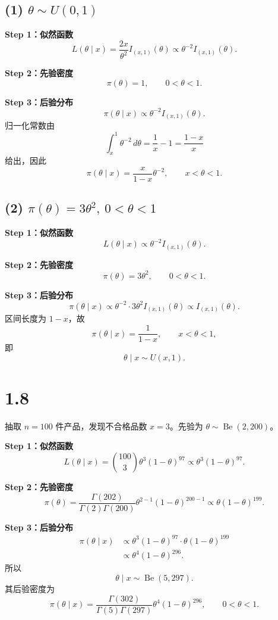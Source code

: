 \documentclass[UTF8,zihao=-4]{ctexart}
\begin{document}
\subsection*{(1) \(\theta\sim U(0,1)\)}
\textbf{Step 1：似然函数}
\[
L(\theta\mid x)=\frac{2x}{\theta^2}I_{(x,1)}(\theta)
\propto\theta^{-2}I_{(x,1)}(\theta).
\]

\textbf{Step 2：先验密度}
\[
\pi(\theta)=1,\qquad0<\theta<1.
\]

\textbf{Step 3：后验分布}
\[
\pi(\theta\mid x)\propto\theta^{-2}I_{(x,1)}(\theta).
\]
归一化常数由
\[
\int_x^1\theta^{-2}\,d\theta=\frac1x-1=\frac{1-x}{x}
\]
给出，因此
\[
\boxed{\pi(\theta\mid x)=\frac{x}{1-x}\theta^{-2},\qquad x<\theta<1.}
\]

\subsection*{(2) \(\pi(\theta)=3\theta^2,\ 0<\theta<1\)}
\textbf{Step 1：似然函数}
\[
L(\theta\mid x)\propto\theta^{-2}I_{(x,1)}(\theta).
\]

\textbf{Step 2：先验密度}
\[
\pi(\theta)=3\theta^2,\qquad0<\theta<1.
\]

\textbf{Step 3：后验分布}
\[
\pi(\theta\mid x)\propto\theta^{-2}\cdot3\theta^2I_{(x,1)}(\theta)
\propto I_{(x,1)}(\theta).
\]
区间长度为 \(1-x\)，故
\[
\boxed{\pi(\theta\mid x)=\frac1{1-x},\qquad x<\theta<1,}
\]
即
\[
\boxed{\theta\mid x\sim U(x,1).}
\]

\section*{1.8}
抽取 \(n=100\) 件产品，发现不合格品数 \(x=3\)。先验为 \(\theta\sim\operatorname{Be}(2,200)\)。

\textbf{Step 1：似然函数}
\[
L(\theta\mid x)=\binom{100}{3}\theta^3(1-\theta)^{97}
\propto\theta^3(1-\theta)^{97}.
\]

\textbf{Step 2：先验密度}
\[
\pi(\theta)=\frac{\Gamma(202)}{\Gamma(2)\Gamma(200)}
\theta^{2-1}(1-\theta)^{200-1}
\propto\theta(1-\theta)^{199}.
\]

\textbf{Step 3：后验分布}
\[
\begin{aligned}
\pi(\theta\mid x)&\propto\theta^3(1-\theta)^{97}
\cdot\theta(1-\theta)^{199}\\
&\propto\theta^4(1-\theta)^{296}.
\end{aligned}
\]
所以
\[
\boxed{\theta\mid x\sim\operatorname{Be}(5,297).}
\]
其后验密度为
\[
\boxed{\pi(\theta\mid x)=\frac{\Gamma(302)}{\Gamma(5)\Gamma(297)}
\theta^4(1-\theta)^{296},\qquad0<\theta<1.}
\]
\end{document}
